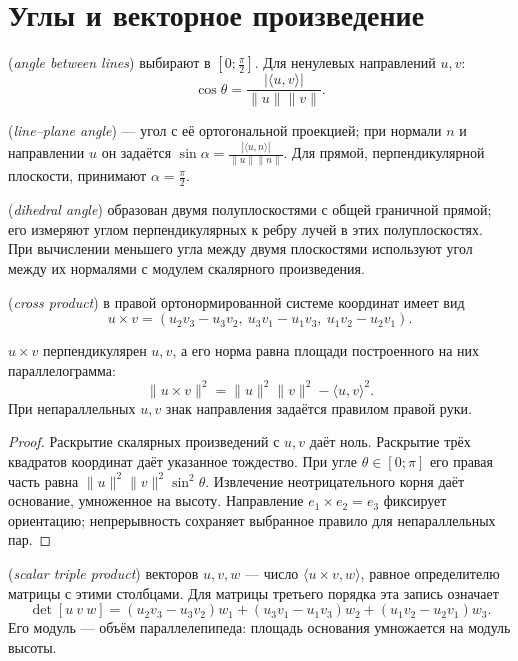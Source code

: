 \section{Углы и векторное произведение}
\begin{definition} (\emph{angle between lines}) выбирают в \([0;\frac\pi2]\). Для ненулевых направлений \(u,v\):
\[
\cos\theta=\frac{|\langle u,v\rangle|}{\|u\|\|v\|}.
\]
\end{definition}
\begin{definition} (\emph{line–plane angle}) — угол с её ортогональной проекцией; при нормали \(n\) и направлении \(u\) он задаётся \(\sin\alpha=\frac{|\langle u,n\rangle|}{\|u\|\|n\|}\). Для прямой, перпендикулярной плоскости, принимают \(\alpha=\frac\pi2\).\end{definition}
\begin{definition} (\emph{dihedral angle}) образован двумя полуплоскостями с общей граничной прямой; его измеряют углом перпендикулярных к ребру лучей в этих полуплоскостях. При вычислении меньшего угла между двумя плоскостями используют угол между их нормалями с модулем скалярного произведения.\end{definition}
\begin{definition} (\emph{cross product}) в правой ортонормированной системе координат имеет вид
\[
u\times v=(u_2v_3-u_3v_2,\ u_3v_1-u_1v_3,\ u_1v_2-u_2v_1).
\]
\end{definition}
\begin{theorem}
\(u\times v\) перпендикулярен \(u,v\), а его норма равна площади построенного на них параллелограмма:
\[
\|u\times v\|^2=\|u\|^2\|v\|^2-\langle u,v\rangle^2.
\]
При непараллельных \(u,v\) знак направления задаётся правилом правой руки.
\end{theorem}
\begin{proof}Раскрытие скалярных произведений с \(u,v\) даёт ноль. Раскрытие трёх квадратов координат даёт указанное тождество. При угле \(\theta\in[0;\pi]\) его правая часть равна \(\|u\|^2\|v\|^2\sin^2\theta\). Извлечение неотрицательного корня даёт основание, умноженное на высоту. Направление \(e_1\times e_2=e_3\) фиксирует ориентацию; непрерывность сохраняет выбранное правило для непараллельных пар.\end{proof}
\begin{definition} (\emph{scalar triple product}) векторов \(u,v,w\) — число \(\langle u\times v,w\rangle\), равное определителю матрицы с этими столбцами. Для матрицы третьего порядка эта запись означает \[\det[u\ v\ w]=(u_2v_3-u_3v_2)w_1+(u_3v_1-u_1v_3)w_2+(u_1v_2-u_2v_1)w_3.\] Его модуль — объём параллелепипеда: площадь основания умножается на модуль высоты.\end{definition}
